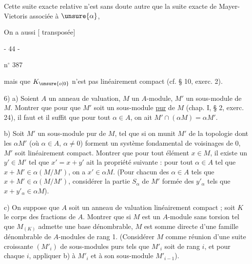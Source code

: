 Cette suite exacte relative n'est sans doute autre que la suite exacte de Mayer-Vietoris associée à $\unsure{\alpha}$,

On a aussi [ transposée]
\begin{center}- 44 -\end{center}
\hfill n$^\circ$ 387

mais que $K_{\unsure{o|0}}$ n'est pas linéairement compact (cf. § 10, exerc. 2).

6) a) Soient $A$ un anneau de valuation, $M$ un $A$-module, $M'$ un sous-module de $M$. Montrer que pour que $M'$ soit un sous-module \uline{pur} de $M$ (chap. I, § 2, exerc. 24), il faut et il suffit que pour tout $\alpha\in A$, on ait $M'\cap(\alpha M)=\alpha M'$.

b) Soit $M'$ un sous-module pur de $M$, tel que si on munit $M'$ de la topologie dont les $\alpha M'$ (où $\alpha\in A$, $\alpha\ne0$) forment un système fondamental de voisinages de $0$, $M'$ soit linéairement compact. Montrer que pour tout élément $x\in M$, il existe un $y'\in M'$ tel que $x'=x+y'$ ait la propriété suivante : pour tout $\alpha\in A$ tel que $x+M'\in\alpha(M/M')$, on a $x'\in\alpha M$. (Pour chacun des $\alpha\in A$ tels que $x+M'\in\alpha(M/M')$, considérer la partie $S_\alpha$ de $M'$ formée des $y'_\alpha$ tels que $x+y'_\alpha\in\alpha M$).

c) On suppose que $A$ soit un anneau de valuation linéairement compact ; soit $K$ le corps des fractions de $A$. Montrer que si $M$ est un $A$-module sans torsion tel que $M_{(K)}$ admette une base dénombrable, $M$ est somme directe d'une famille dénombrable de $A$-modules de rang 1. (Considérer $M$ comme réunion d'une suite croissante $(M'_i)$ de sous-modules purs tels que $M'_i$ soit de rang $i$, et pour chaque $i$, appliquer b) à $M'_i$ et à son sous-module $M'_{i-1}$).

